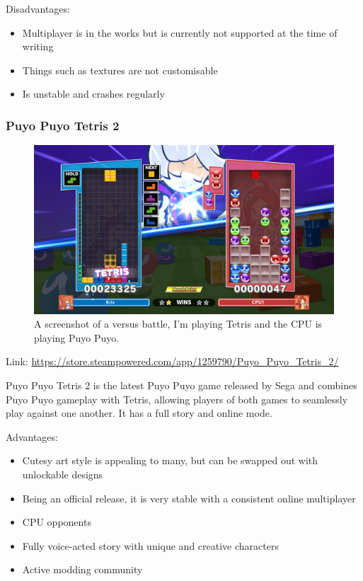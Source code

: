 \documentclass{article}
\begin{document}
\vspace{0.7cm}

Disadvantages: 

\begin{itemize}
    \renewcommand\labelitemi{--}
    \item Multiplayer is in the works but is currently not supported at the time of writing
    \item Things such as textures are not customisable
    \item Is unstable and crashes regularly
\end{itemize}

\subsubsection{Puyo Puyo Tetris 2}

\begin{figure}[h]
\centering
\includegraphics[width=1\textwidth]{ppt2.png}
\caption{\label{fig:ppt2}A screenshot of a versus battle, I'm playing Tetris and the CPU is playing Puyo Puyo.}
\end{figure}
Link: \href{https://store.steampowered.com/app/1259790/Puyo_Puyo_Tetris_2/}{https://store.steampowered.com/app/1259790/Puyo\_Puyo\_Tetris\_2/}

Puyo Puyo Tetris 2 is the latest Puyo Puyo game released by Sega and combines Puyo Puyo gameplay with Tetris, allowing players of both games to seamlessly play against one another. It has a full story and online mode.
\vspace{1cm}

Advantages:

\begin{itemize}
    \renewcommand\labelitemi{--}
    \item Cutesy art style is appealing to many, but can be swapped out with unlockable designs
    \item Being an official release, it is very stable with a consistent online multiplayer
    \item CPU opponents
    \item Fully voice-acted story with unique and creative characters
    \item Active modding community
\end{itemize}
\end{document}
